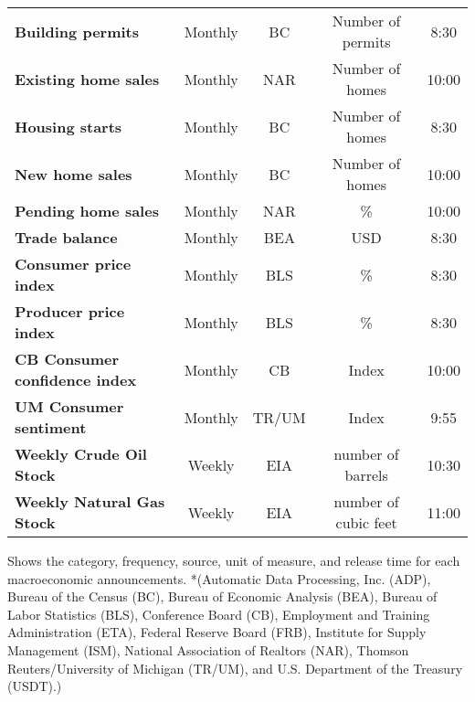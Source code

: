 \begin{table}[]
\begin{center}
\begin{tabular}{@{}lcccc@{}}
\textbf{Building permits}                 & Monthly            & BC              & Number of permits & 8:30          \\
\textbf{Existing home sales}              & Monthly            & NAR             & Number of homes   & 10:00         \\
\textbf{Housing starts}                   & Monthly            & BC              & Number of homes   & 8:30          \\
\textbf{New home sales}                   & Monthly            & BC              & Number of homes   & 10:00         \\
\textbf{Pending home sales}               & Monthly            & NAR             & \%                & 10:00         \\
\textbf{Trade balance}                    & Monthly            & BEA             & USD               & 8:30          \\
\textbf{Consumer price index}             & Monthly            & BLS             & \%                & 8:30          \\
\textbf{Producer price index}             & Monthly            & BLS             & \%                & 8:30          \\
\textbf{CB Consumer confidence index}     & Monthly            & CB              & Index             & 10:00         \\
\textbf{UM Consumer sentiment}            & Monthly            & TR/UM           & Index             & 9:55          \\
\textbf{Weekly Crude Oil Stock}            & Weekly            & EIA           & number of barrels              & 10:30          \\
\textbf{Weekly Natural Gas Stock}            & Weekly            & EIA           & number of cubic feet             & 11:00          \\\bottomrule
\end{tabular}
\end{center}
\begin{tablenotes}\item 
        \singlespacing
        \footnotesize
Shows the category, frequency, source, unit of measure, and release time for each macroeconomic announcements.  *(Automatic Data Processing, Inc. (ADP), Bureau of the Census (BC), Bureau of Economic Analysis (BEA), Bureau of Labor Statistics (BLS), Conference Board (CB), Employment and Training Administration (ETA), Federal Reserve Board (FRB), Institute for Supply Management (ISM), National Association of Realtors (NAR), Thomson Reuters/University of Michigan (TR/UM), and U.S. Department of the Treasury (USDT).)
\end{tablenotes}
\end{table}



